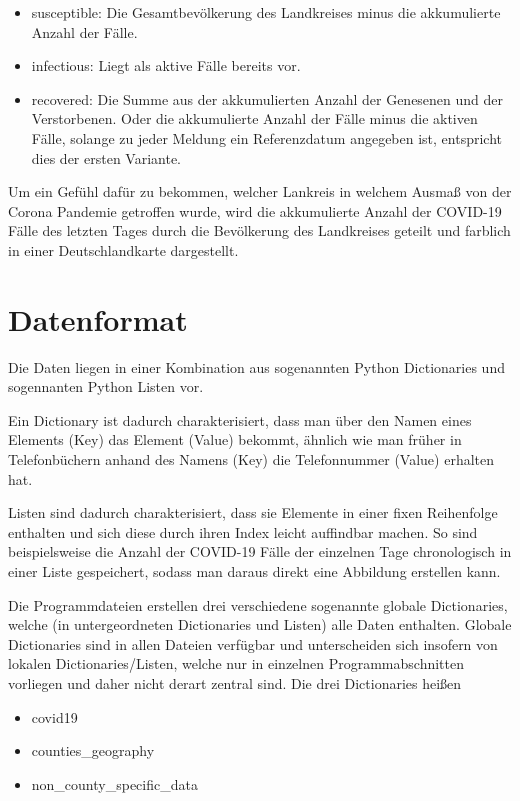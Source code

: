 \begin{itemize}
    \item \glqq{}susceptible\grqq{}: Die Gesamtbevölkerung des Landkreises minus die akkumulierte Anzahl der Fälle.
    \item \glqq{}infectious\grqq{}: Liegt als aktive Fälle bereits vor.
    \item \glqq{}recovered\grqq{}:
    Die Summe aus der akkumulierten Anzahl der Genesenen und der Verstorbenen. Oder die akkumulierte Anzahl der Fälle minus die aktiven Fälle, solange zu jeder Meldung ein Referenzdatum angegeben ist, entspricht dies der ersten Variante.
\end{itemize}

Um ein Gefühl dafür zu bekommen, welcher Lankreis in welchem Ausmaß von der Corona Pandemie getroffen wurde, wird die akkumulierte Anzahl der COVID-19 Fälle des letzten Tages durch die Bevölkerung des Landkreises geteilt und farblich in einer Deutschlandkarte dargestellt.

\section{Datenformat}
Die Daten liegen in einer Kombination aus sogenannten Python Dictionaries und sogennanten Python Listen vor.

Ein Dictionary ist dadurch charakterisiert, dass man über den Namen eines Elements (\glqq{}Key\grqq{}) das Element (\glqq{}Value\grqq{}) bekommt, ähnlich wie man früher in Telefonbüchern anhand des Namens (Key) die Telefonnummer (Value) erhalten hat.

Listen sind dadurch charakterisiert, dass sie Elemente in einer fixen Reihenfolge enthalten und sich diese durch ihren Index leicht auffindbar machen. So sind beispielsweise die Anzahl der COVID-19 Fälle der einzelnen Tage chronologisch in einer Liste gespeichert, sodass man daraus direkt eine Abbildung erstellen kann.


Die Programmdateien erstellen drei verschiedene sogenannte globale Dictionaries, welche (in untergeordneten Dictionaries und Listen) alle Daten enthalten. Globale Dictionaries sind in allen Dateien verfügbar und unterscheiden sich insofern von lokalen Dictionaries/Listen, welche nur in einzelnen Programmabschnitten vorliegen und daher nicht derart zentral sind.
Die drei Dictionaries heißen
\begin{itemize}
    \item covid19
    \item counties\_geography
    \item non\_county\_specific\_data
\end{itemize}

